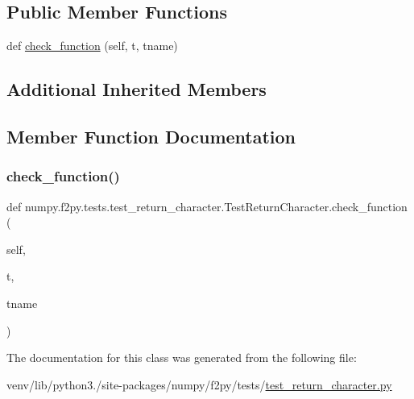 \subsection*{Public Member Functions}
\begin{DoxyCompactItemize}
\item 
def \hyperlink{classnumpy_1_1f2py_1_1tests_1_1test__return__character_1_1TestReturnCharacter_a95bb1ea457339e3b1810a042bc509ad9}{check\+\_\+function} (self, t, tname)
\end{DoxyCompactItemize}
\subsection*{Additional Inherited Members}


\subsection{Member Function Documentation}
\mbox{\label{classnumpy_1_1f2py_1_1tests_1_1test__return__character_1_1TestReturnCharacter_a95bb1ea457339e3b1810a042bc509ad9}} 
\subsubsection{\texorpdfstring{check\+\_\+function()}{check\_function()}}
{\footnotesize\ttfamily def numpy.\+f2py.\+tests.\+test\+\_\+return\+\_\+character.\+Test\+Return\+Character.\+check\+\_\+function (\begin{DoxyParamCaption}\item[{}]{self,  }\item[{}]{t,  }\item[{}]{tname }\end{DoxyParamCaption})}



The documentation for this class was generated from the following file\+:\begin{DoxyCompactItemize}
\item 
venv/lib/python3./site-\/packages/numpy/f2py/tests/\hyperlink{test__return__character_8py}{test\+\_\+return\+\_\+character.\+py}\end{DoxyCompactItemize}
